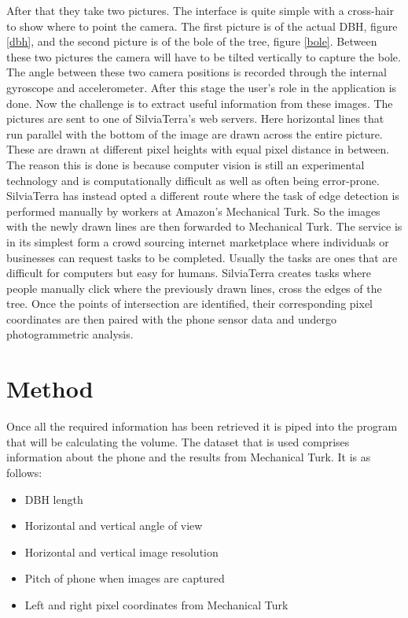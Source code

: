 After that they take two pictures. The interface is quite simple with a cross-hair to show where to point the camera. The first picture is of the actual DBH, figure \ref{dbh}, and the second picture is of the bole of the tree, figure \ref{bole}. Between these two pictures the camera will have to be tilted vertically to capture the bole. The angle between these two camera positions is recorded through the internal gyroscope and accelerometer. After this stage the user's role in the application is done. Now the challenge is to extract useful information from these images. The pictures are sent to one of SilviaTerra's web servers. Here horizontal lines that run parallel with the bottom of the image are drawn across the entire picture. These are drawn at different pixel heights with equal pixel distance in between. The reason this is done is because computer vision is still an experimental technology and is computationally difficult as well as often being error-prone. SilviaTerra has instead opted a different route where the task of edge detection is performed manually by workers at Amazon's Mechanical Turk. So the images with the newly drawn lines are then forwarded to Mechanical Turk. The service is in its simplest form a crowd sourcing internet marketplace where individuals or businesses can request tasks to be completed. Usually the tasks are ones that are difficult for computers but easy for humans. SilviaTerra creates tasks where people manually click where the previously drawn lines, cross the edges of the tree. Once the points of intersection are identified, their corresponding pixel coordinates are then paired with the phone sensor data and undergo photogrammetric analysis.

\section{Method}
Once all the required information has been retrieved it is piped into the program that will be calculating the volume. The dataset that is used comprises information about the phone and the results from Mechanical Turk. It is as follows:
\begin{itemize}
	\item DBH length
	\item Horizontal and vertical angle of view
	\item Horizontal and vertical image resolution
	\item Pitch of phone when images are captured
	\item Left and right pixel coordinates from Mechanical Turk
\end{itemize}

